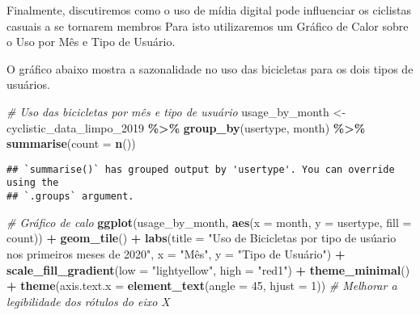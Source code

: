 \documentclass[
]{article}
\newenvironment{Shaded}{\begin{snugshade}}{\end{snugshade}}
\newcommand{\AttributeTok}[1]{\textcolor[rgb]{0.13,0.29,0.53}{#1}}
\newcommand{\CommentTok}[1]{\textcolor[rgb]{0.56,0.35,0.01}{\textit{#1}}}
\newcommand{\DecValTok}[1]{\textcolor[rgb]{0.00,0.00,0.81}{#1}}
\newcommand{\FunctionTok}[1]{\textcolor[rgb]{0.13,0.29,0.53}{\textbf{#1}}}
\newcommand{\NormalTok}[1]{#1}
\newcommand{\OtherTok}[1]{\textcolor[rgb]{0.56,0.35,0.01}{#1}}
\newcommand{\SpecialCharTok}[1]{\textcolor[rgb]{0.81,0.36,0.00}{\textbf{#1}}}
\newcommand{\StringTok}[1]{\textcolor[rgb]{0.31,0.60,0.02}{#1}}
\begin{document}
Finalmente, discutiremos como o uso de mídia digital pode influenciar os
ciclistas casuais a se tornarem membros Para isto utilizaremos um
Gráfico de Calor sobre o Uso por Mês e Tipo de Usuário.

O gráfico abaixo mostra a sazonalidade no uso das bicicletas para os
dois tipos de usuários.

\begin{Shaded}
\begin{Highlighting}[]
\CommentTok{\# Uso das bicicletas por mês e tipo de usuário}
\NormalTok{usage\_by\_month }\OtherTok{\textless{}{-}}\NormalTok{ cyclistic\_data\_limpo\_2019 }\SpecialCharTok{\%\textgreater{}\%}
  \FunctionTok{group\_by}\NormalTok{(usertype, month) }\SpecialCharTok{\%\textgreater{}\%}
  \FunctionTok{summarise}\NormalTok{(}\AttributeTok{count =} \FunctionTok{n}\NormalTok{())}
\end{Highlighting}
\end{Shaded}

\begin{verbatim}
## `summarise()` has grouped output by 'usertype'. You can override using the
## `.groups` argument.
\end{verbatim}

\begin{Shaded}
\begin{Highlighting}[]
\CommentTok{\# Gráfico de calo}
\FunctionTok{ggplot}\NormalTok{(usage\_by\_month, }\FunctionTok{aes}\NormalTok{(}\AttributeTok{x =}\NormalTok{ month, }\AttributeTok{y =}\NormalTok{ usertype, }\AttributeTok{fill =}\NormalTok{ count)) }\SpecialCharTok{+}
  \FunctionTok{geom\_tile}\NormalTok{() }\SpecialCharTok{+}
  \FunctionTok{labs}\NormalTok{(}\AttributeTok{title =} \StringTok{"Uso de Bicicletas por tipo de usúario nos primeiros meses de 2020"}\NormalTok{, }
       \AttributeTok{x =} \StringTok{"Mês"}\NormalTok{, }
       \AttributeTok{y =} \StringTok{"Tipo de Usuário"}\NormalTok{) }\SpecialCharTok{+}
  \FunctionTok{scale\_fill\_gradient}\NormalTok{(}\AttributeTok{low =} \StringTok{"lightyellow"}\NormalTok{, }\AttributeTok{high =} \StringTok{"red1"}\NormalTok{) }\SpecialCharTok{+}
  \FunctionTok{theme\_minimal}\NormalTok{() }\SpecialCharTok{+}
  \FunctionTok{theme}\NormalTok{(}\AttributeTok{axis.text.x =} \FunctionTok{element\_text}\NormalTok{(}\AttributeTok{angle =} \DecValTok{45}\NormalTok{, }\AttributeTok{hjust =} \DecValTok{1}\NormalTok{))  }\CommentTok{\# Melhorar a legibilidade dos rótulos do eixo X}
\end{Highlighting}
\end{Shaded}
\end{document}
